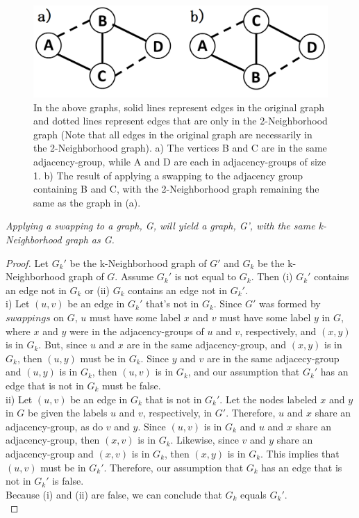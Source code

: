 \begin{figure}[ht]
  \centering
  \includegraphics[scale=0.3 ]{Sample-Graph.png}
  \caption{In the above graphs, solid lines represent edges in the original graph and dotted lines represent edges that are only in the 2-Neighborhood graph (Note that all edges in the original graph are necessarily in the 2-Neighborhood graph). a)  The vertices B and C are in the same adjacency-group, while A and D are each in adjacency-groups of size 1. b) The result of applying a swapping to the adjacency group containing B and C, with the 2-Neighborhood graph remaining the same as the graph in (a).}
  \label{fig:sample graph}
\end{figure}




\begin{thm}  \emph{Applying a swapping to a graph, G, will yield a graph, G', with the same k-Neighborhood graph as G.}
\end{thm}
\begin{proof}
\noindent Let $G_k'$ be the k-Neighborhood graph of $G'$ and $G_k$ be the k-Neighborhood graph of $G$. Assume $G_k'$ is not equal to $G_k$. Then (i) $G_k'$ contains an edge not in $G_k$ or (ii) $G_k$ contains an edge not in $G_k'$.  \\
\indent i) Let $(u,v)$ be an edge in $G_k'$ that's not in $G_k$. Since $G'$ was formed by $swappings$ on $G$, $u$ must have some label $x$ and $v$ must have some label $y$ in $G$, where $x$ and $y$ were in the adjacency-groups of $u$ and $v$, respectively, and $(x,y)$ is in $G_k$. But, since $u$ and $x$ are in the same adjacency-group, and $(x,y)$ is in $G_k$, then $(u,y)$ must be in $G_k$. Since $y$ and $v$ are in the same adjacecy-group and $(u,y)$ is in $G_k$, then $(u,v)$ is in $G_k$, and our assumption that $G_k'$ has an edge that is not in $G_k$ must be false.\\
\indent 			ii) Let $(u,v)$ be an edge in $G_k$ that is not in $G_k'.$ Let the nodes labeled $x$ and $y$ in $G$ be given the labels $u$ and $v$, respectively, in $G'$. Therefore, $u$ and $x$ share an adjacency-group, as do $v$ and $y$.  Since $(u,v)$ is in $G_k$ and $u$ and $x$ share an adjacency-group, then $(x,v)$ is in $G_k$. Likewise, since $v$ and $y$ share an adjacency-group and $(x,v)$ is in $G_k$, then $(x,y)$ is in $G_k$. This implies that $(u,v)$ must be in $G_k'$. Therefore, our assumption that $G_k$ has an edge that is not in $G_k'$ is false. \\
\indent Because (i) and (ii) are false, we can conclude that $G_k$ equals $G_k'$.\\
\end{proof}
